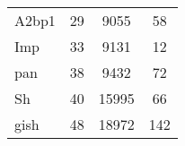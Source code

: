 \begin{tabular}[c]{lccc}
	A2bp1              & 29                  & 9055                    & 58\\                          
	Imp                & 33                  & 9131                    & 12\\                          
	pan                & 38                  & 9432                    & 72\\                          
	Sh                 & 40                  & 15995                   & 66\\                          
	gish               & 48                  & 18972                   & 142\\                         
  \end{tabular}